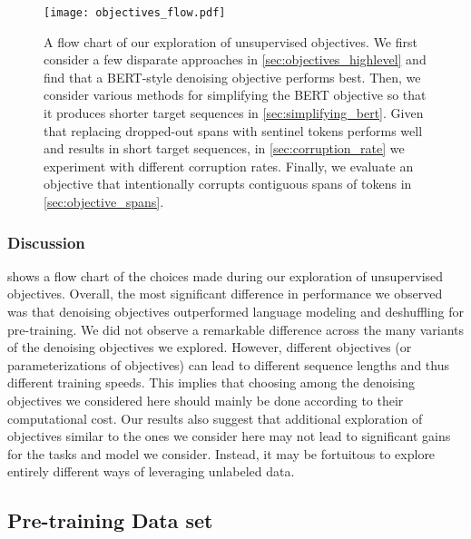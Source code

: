 \documentclass[twoside,11pt]{article}
\begin{document}
\begin{figure}[t]
    \centering
    \texttt{[image: objectives\_flow.pdf]}
    \caption{
    A flow chart of our exploration of unsupervised objectives.
    We first consider a few disparate approaches in \cref{sec:objectives_highlevel} and find that a BERT-style denoising objective performs best.
    Then, we consider various methods for simplifying the BERT objective so that it produces shorter target sequences in \cref{sec:simplifying_bert}.
    Given that replacing dropped-out spans with sentinel tokens performs well and results in short target sequences, in \cref{sec:corruption_rate} we experiment with different corruption rates.
    Finally, we evaluate an objective that intentionally corrupts contiguous spans of tokens in \cref{sec:objective_spans}.
    }
    \label{fig:objectives_flow}
\end{figure}

\subsubsection{Discussion}

 shows a flow chart of the choices made during our exploration of unsupervised objectives.
Overall, the most significant difference in performance we observed was that denoising objectives outperformed language modeling and deshuffling for pre-training.
We did not observe a remarkable difference across the many variants of the denoising objectives we explored.
However, different objectives (or parameterizations of objectives) can lead to different sequence lengths and thus different training speeds.
This implies that choosing among the denoising objectives we considered here should mainly be done according to their computational cost.
Our results also suggest that additional exploration of objectives similar to the ones we consider here may not lead to significant gains for the tasks and model we consider.
Instead, it may be fortuitous to explore entirely different ways of leveraging unlabeled data.

\subsection{Pre-training Data set}
\label{sec:datasets}
\end{document}
